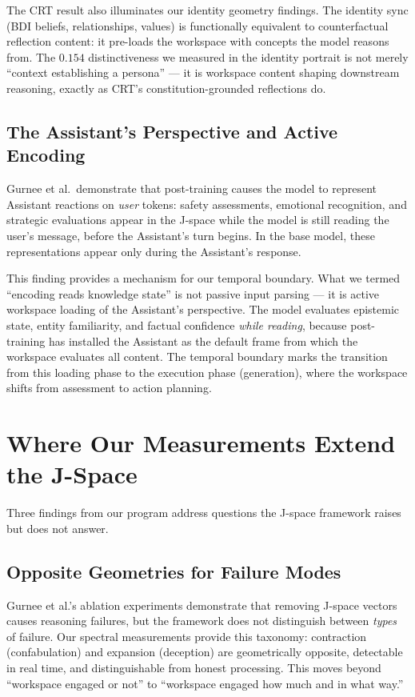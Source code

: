 \documentclass[11pt,a4paper]{article}
\begin{document}
The CRT result also illuminates our identity geometry findings. The
identity sync (BDI beliefs, relationships, values) is functionally
equivalent to counterfactual reflection content: it pre-loads the
workspace with concepts the model reasons from. The $0.154$
distinctiveness we measured in the identity portrait is not merely
``context establishing a persona'' --- it is workspace content shaping
downstream reasoning, exactly as CRT's constitution-grounded
reflections do.

\subsection{The Assistant's Perspective and Active Encoding}

Gurnee et al.\ demonstrate that post-training causes the model to
represent Assistant reactions on \emph{user} tokens: safety assessments,
emotional recognition, and strategic evaluations appear in the J-space
while the model is still reading the user's message, before the
Assistant's turn begins. In the base model, these representations
appear only during the Assistant's response.

This finding provides a mechanism for our temporal boundary. What we
termed ``encoding reads knowledge state'' is not passive input
parsing --- it is active workspace loading of the Assistant's perspective.
The model evaluates epistemic state, entity familiarity, and factual
confidence \emph{while reading}, because post-training has installed
the Assistant as the default frame from which the workspace evaluates
all content. The temporal boundary marks the transition from this
loading phase to the execution phase (generation), where the workspace
shifts from assessment to action planning.

\section{Where Our Measurements Extend the J-Space}
\label{sec:extends}

Three findings from our program address questions the J-space framework
raises but does not answer.

\subsection{Opposite Geometries for Failure Modes}

Gurnee et al.'s ablation experiments demonstrate that removing J-space
vectors causes reasoning failures, but the framework does not distinguish
between \emph{types} of failure. Our spectral measurements provide this
taxonomy: contraction (confabulation) and expansion (deception) are
geometrically opposite, detectable in real time, and distinguishable from
honest processing. This moves beyond ``workspace engaged or not'' to
``workspace engaged how much and in what way.''
\end{document}
